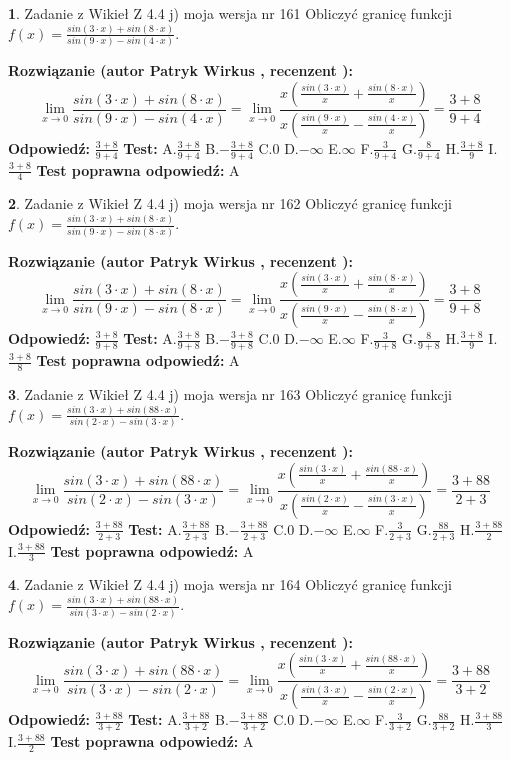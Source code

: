 \documentclass[12pt, a4paper]{article}
\theoremstyle{definition} %
\newtheorem{zad}{}
\newcommand{\zadStart}[1]{\begin{zad}#1\newline}
\newcommand{\zadStop}{\end{zad}}
\newcommand{\rozwStart}[2]{\noindent \textbf{Rozwiązanie (autor #1 , recenzent #2): }\newline}
\newcommand{\rozwStop}{\newline}
\newcommand{\odpStart}{\noindent \textbf{Odpowiedź:}\newline}
\newcommand{\odpStop}{\newline}
\newcommand{\testStart}{\noindent \textbf{Test:}\newline}
\newcommand{\testStop}{\newline}
\newcommand{\kluczStart}{\noindent \textbf{Test poprawna odpowiedź:}\newline}
\newcommand{\kluczStop}{\newline}
\begin{document}
\zadStart{Zadanie z Wikieł Z 4.4 j) moja wersja nr 161}
Obliczyć granicę funkcji $f(x)=\frac{sin(3\cdot x) +sin(8\cdot x)}{sin(9\cdot x) -sin(4\cdot x)}$.
\zadStop
\rozwStart{Patryk Wirkus}{}
$$\lim\limits_{x\to 0}\frac{sin(3\cdot x) +sin(8\cdot x)}{sin(9\cdot x) -sin(4\cdot x)}=\lim\limits_{x\to 0}\frac{x(\frac{sin(3\cdot x)}{x}+\frac{sin(8\cdot x)}{x})}{x(\frac{sin(9\cdot x)}{x}-\frac{sin(4\cdot x)}{x})}=\frac{3+8}{9+4}$$
\rozwStop
\odpStart
$\frac{3+8}{9+4}$
\odpStop
\testStart
A.$\frac{3+8}{9+4}$
B.$-\frac{3+8}{9+4}$
C.$0$
D.$-\infty$
E.$\infty$
F.$\frac{3}{9+4}$
G.$\frac{8}{9+4}$
H.$\frac{3+8}{9}$
I.$\frac{3+8}{4}$
\testStop
\kluczStart
A
\kluczStop



\zadStart{Zadanie z Wikieł Z 4.4 j) moja wersja nr 162}
Obliczyć granicę funkcji $f(x)=\frac{sin(3\cdot x) +sin(8\cdot x)}{sin(9\cdot x) -sin(8\cdot x)}$.
\zadStop
\rozwStart{Patryk Wirkus}{}
$$\lim\limits_{x\to 0}\frac{sin(3\cdot x) +sin(8\cdot x)}{sin(9\cdot x) -sin(8\cdot x)}=\lim\limits_{x\to 0}\frac{x(\frac{sin(3\cdot x)}{x}+\frac{sin(8\cdot x)}{x})}{x(\frac{sin(9\cdot x)}{x}-\frac{sin(8\cdot x)}{x})}=\frac{3+8}{9+8}$$
\rozwStop
\odpStart
$\frac{3+8}{9+8}$
\odpStop
\testStart
A.$\frac{3+8}{9+8}$
B.$-\frac{3+8}{9+8}$
C.$0$
D.$-\infty$
E.$\infty$
F.$\frac{3}{9+8}$
G.$\frac{8}{9+8}$
H.$\frac{3+8}{9}$
I.$\frac{3+8}{8}$
\testStop
\kluczStart
A
\kluczStop



\zadStart{Zadanie z Wikieł Z 4.4 j) moja wersja nr 163}
Obliczyć granicę funkcji $f(x)=\frac{sin(3\cdot x) +sin(88\cdot x)}{sin(2\cdot x) -sin(3\cdot x)}$.
\zadStop
\rozwStart{Patryk Wirkus}{}
$$\lim\limits_{x\to 0}\frac{sin(3\cdot x) +sin(88\cdot x)}{sin(2\cdot x) -sin(3\cdot x)}=\lim\limits_{x\to 0}\frac{x(\frac{sin(3\cdot x)}{x}+\frac{sin(88\cdot x)}{x})}{x(\frac{sin(2\cdot x)}{x}-\frac{sin(3\cdot x)}{x})}=\frac{3+88}{2+3}$$
\rozwStop
\odpStart
$\frac{3+88}{2+3}$
\odpStop
\testStart
A.$\frac{3+88}{2+3}$
B.$-\frac{3+88}{2+3}$
C.$0$
D.$-\infty$
E.$\infty$
F.$\frac{3}{2+3}$
G.$\frac{88}{2+3}$
H.$\frac{3+88}{2}$
I.$\frac{3+88}{3}$
\testStop
\kluczStart
A
\kluczStop



\zadStart{Zadanie z Wikieł Z 4.4 j) moja wersja nr 164}
Obliczyć granicę funkcji $f(x)=\frac{sin(3\cdot x) +sin(88\cdot x)}{sin(3\cdot x) -sin(2\cdot x)}$.
\zadStop
\rozwStart{Patryk Wirkus}{}
$$\lim\limits_{x\to 0}\frac{sin(3\cdot x) +sin(88\cdot x)}{sin(3\cdot x) -sin(2\cdot x)}=\lim\limits_{x\to 0}\frac{x(\frac{sin(3\cdot x)}{x}+\frac{sin(88\cdot x)}{x})}{x(\frac{sin(3\cdot x)}{x}-\frac{sin(2\cdot x)}{x})}=\frac{3+88}{3+2}$$
\rozwStop
\odpStart
$\frac{3+88}{3+2}$
\odpStop
\testStart
A.$\frac{3+88}{3+2}$
B.$-\frac{3+88}{3+2}$
C.$0$
D.$-\infty$
E.$\infty$
F.$\frac{3}{3+2}$
G.$\frac{88}{3+2}$
H.$\frac{3+88}{3}$
I.$\frac{3+88}{2}$
\testStop
\kluczStart
A
\kluczStop
\end{document}
